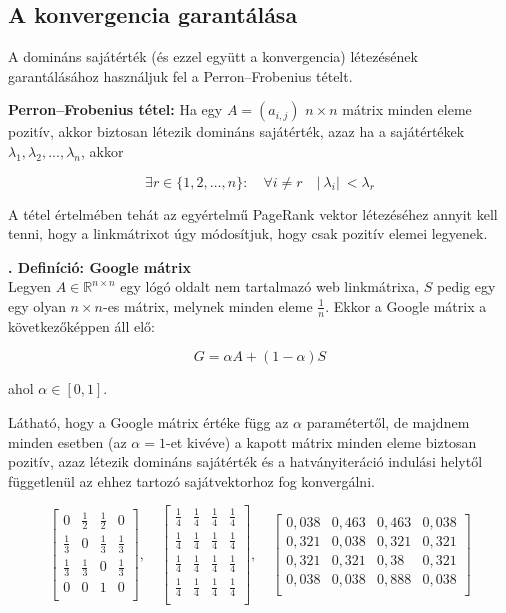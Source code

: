 \documentclass[12pt,a4paper]{article}
\newcounter{definicioszam}
\newenvironment{definicio}[1]
{{\medskip}\noindent \stepcounter{definicioszam}
{\bfseries{\thedefinicioszam. Definíció: #1\\[1ex]}}}{\bigskip }
\begin{document}
\subsection{A konvergencia garantálása}\label{konvergencia_garantalas}

A domináns sajátérték (és ezzel együtt a konvergencia) létezésének garantálásához használjuk fel a Perron–Frobenius tételt.

\vspace{0.1cm}
\textbf{Perron–Frobenius tétel:} Ha egy $A = (a_{i,j})$ $n \times n$ mátrix minden eleme pozitív, akkor biztosan létezik domináns sajátérték, azaz ha a sajátértékek $\lambda_1 , \lambda_2 , ... , \lambda_n$, akkor

\[ \exists r \in \{1,2,...,n\}: \quad \forall i \neq r \quad |\ \lambda_i |\ < \lambda_r  \]

A tétel értelmében tehát az egyértelmű PageRank vektor létezéséhez annyit kell tenni, hogy a linkmátrixot úgy módosítjuk, hogy csak pozitív elemei legyenek.

\begin{definicio}{Google mátrix}
	Legyen $A \in \mathbb{R}^{n \times n}$ egy lógó oldalt nem tartalmazó web linkmátrixa, $S$ pedig egy egy olyan $n \times n$-es mátrix, melynek minden eleme $\frac{1}{n}$. Ekkor a Google mátrix a következőképpen áll elő:
	
	\[ G = \alpha A + (1-\alpha) S \]
	
	ahol $\alpha \in [0,1]$.
\end{definicio}

Látható, hogy a Google mátrix értéke függ az $\alpha$ paramétertől, de majdnem minden esetben (az $\alpha = 1$-et kivéve) a kapott mátrix minden eleme biztosan pozitív, azaz létezik domináns sajátérték és a hatványiteráció indulási helytől függetlenül az ehhez tartozó sajátvektorhoz fog konvergálni.
\vspace{0.1 cm}

\[
\begin{bmatrix}
0 & \frac{1}{2} & \frac{1}{2} & 0 \\
\frac{1}{3} & 0 & \frac{1}{3} & \frac{1}{3} \\
\frac{1}{3} & \frac{1}{3} & 0 & \frac{1}{3} \\
0 & 0 & 1 & 0 \\
\end{bmatrix}, \quad
\begin{bmatrix}
\frac{1}{4} & \frac{1}{4} & \frac{1}{4} & \frac{1}{4} \\
\frac{1}{4} & \frac{1}{4} & \frac{1}{4} & \frac{1}{4} \\
\frac{1}{4} & \frac{1}{4} & \frac{1}{4} & \frac{1}{4} \\
\frac{1}{4} & \frac{1}{4} & \frac{1}{4} & \frac{1}{4} \\
\end{bmatrix}, \quad
\begin{bmatrix}
0,038 & 0,463 & 0,463 & 0,038 \\
0,321 & 0,038 & 0,321 & 0,321 \\
0,321 & 0,321 & 0,38 & 0,321 \\
0,038 & 0,038 & 0,888 & 0,038 \\
\end{bmatrix}
\]
\end{document}

